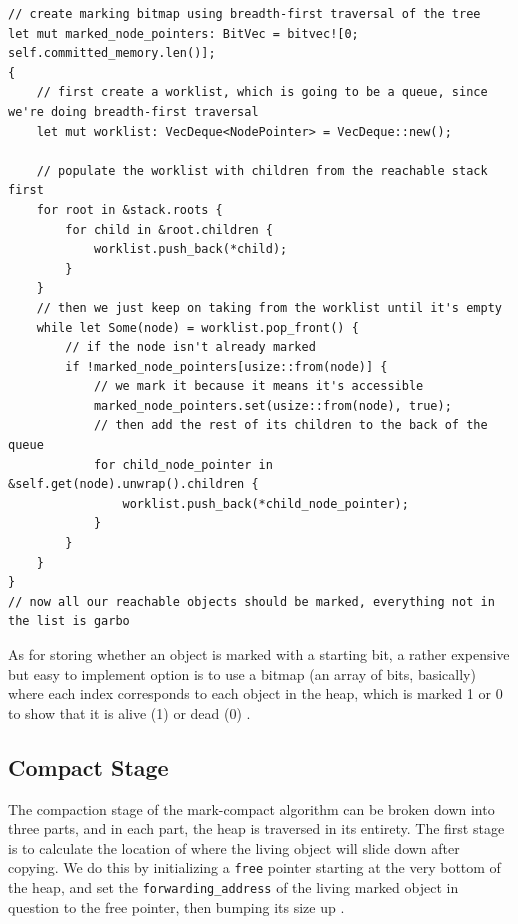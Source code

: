 \documentclass[index]{subfiles}
\begin{document}
\begin{verbatim}
// create marking bitmap using breadth-first traversal of the tree
let mut marked_node_pointers: BitVec = bitvec![0; self.committed_memory.len()];
{
    // first create a worklist, which is going to be a queue, since we're doing breadth-first traversal
    let mut worklist: VecDeque<NodePointer> = VecDeque::new();

    // populate the worklist with children from the reachable stack first
    for root in &stack.roots {
        for child in &root.children {
            worklist.push_back(*child);
        }
    }
    // then we just keep on taking from the worklist until it's empty
    while let Some(node) = worklist.pop_front() {
        // if the node isn't already marked
        if !marked_node_pointers[usize::from(node)] {
            // we mark it because it means it's accessible
            marked_node_pointers.set(usize::from(node), true);
            // then add the rest of its children to the back of the queue
            for child_node_pointer in &self.get(node).unwrap().children {
                worklist.push_back(*child_node_pointer);
            }
        }
    }
}
// now all our reachable objects should be marked, everything not in the list is garbo
\end{verbatim}

As for storing whether an object is marked with a starting bit, a rather expensive but easy to implement option is to use a bitmap (an array of bits, basically) where each index corresponds to each object in the heap, which is marked 1 or 0 to show that it is alive (1) or dead (0) \cite[Chapter~3]{gc_handbook}.

\subsection{Compact Stage}

The compaction stage of the mark-compact algorithm can be broken down into three parts, and in each part, the heap is traversed in its entirety. The first stage is to calculate the location of where the living object will slide down after copying. We do this by initializing a \verb+free+ pointer starting at the very bottom of the heap, and set the \verb+forwarding_address+ of the living marked object in question to the free pointer, then bumping its size up \cites[Chapter~3]{gc_handbook}[Sections~3.3-3.5]{redhat_openjdk}.
\end{document}
